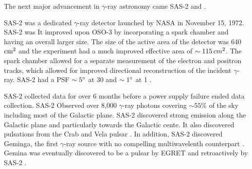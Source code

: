

The next major advancement in $\gamma$-ray astronomy came 
\ac{SAS-2} and \cosb.

\Ac{SAS-2} was a dedicated $\gamma$-ray detector
launched by \ac{NASA} in November 15, 1972.  \ac{SAS-2} was
\cite{fichtel_1975_high-energy-gamma-ray} It improved upon \ac{OSO-3}
by incorporating a spark chamber and having an overall larger size.
The size of the active area of the detector was 640 $\text{cm}^2$ and the
experiment had a much improved effective area of $\sim 115\, cm^2$. The
spark chamber allowed for a separate measurement of the electron and
positron tracks, which allowed for improved directional reconstruction
of the incident $\gamma$-ray. \Ac{SAS-2} had a PSF $\sim5^\circ$ at 30
\mev and $\sim1^\circ$ at 1 \gev.

\Ac{SAS-2} collected data for over 6 months before a power supply
failure ended data collection. \Ac{SAS-2} Observed over 8,000
$\gamma$-ray photons covering $\sim55\%$ of
the sky including most of the Galactic plane.  
\Ac{SAS-2} discovered strong emission
along the Galactic plane and particularly towards the Galactic
cente. It also discovered
pulsations from the
Crab \citep{fichtel_1975_high-energy-gamma-ray} and Vela pulsar
\citep{thompson_1977_sas-2-high-energy}.  In addition, \ac{SAS-2}
discovered Geminga, the first $\gamma$-ray source with no compelling
multiwavelenth counterpart \citep{thompson_1977_final-sas-2}. Gemina
was eventually discovered to be a pulsar by \ac{EGRET}
\citep{bertsch_1992_pulsed-high-energy} and retroactively by \ac{SAS-2}
\citep{mattox_1992_observation-pulsed}.


